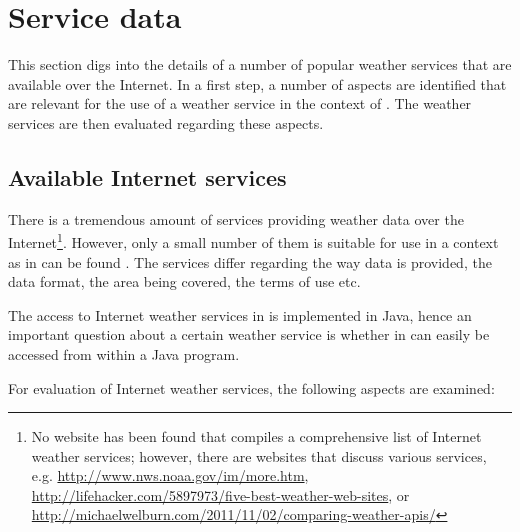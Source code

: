 
\section{Service data}
\label{sec:weather_services}

This section digs into the details of a number of popular weather services that are available over the Internet. In a first step, a number of aspects are identified that are relevant for the use of a weather service in the context of \thinkhome. The weather services are then evaluated regarding these aspects.

\subsection{Available Internet services}
\label{sec:internet_services}

There is a tremendous amount of services providing weather data over the Internet\footnote{No website has been found that compiles a comprehensive list of Internet weather services; however, there are websites that discuss various services, e.g. \href{http://www.nws.noaa.gov/im/more.htm}{http://www.nws.noaa.gov/im/more.htm}, \href{http://lifehacker.com/5897973/five-best-weather-web-sites}{http://lifehacker.com/5897973/five-best-weather-web-sites}, or \href{http://michaelwelburn.com/2011/11/02/comparing-weather-apis/}{http://michaelwelburn.com/2011/11/02/comparing-weather-apis/}}. However, only a small number of them is suitable for use in a context as in can be found \thinkhome. The services differ regarding the way data is provided, the data format, the area being covered, the terms of use etc.

The access to Internet weather services in \thinkhome is implemented in Java, hence an important question about a certain weather service is whether in can easily be accessed from within a Java program.

For evaluation of Internet weather services, the following aspects are examined:

